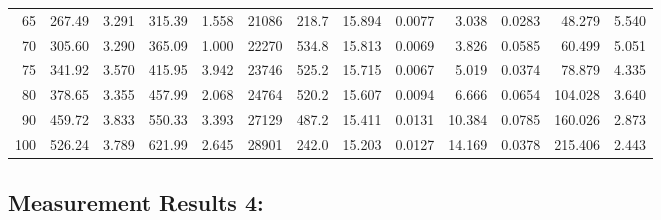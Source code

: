 \documentclass[10pt]{article}
\begin{document}
{\begin{tabular}{|r|rr|rr|rr|rr|rr|r|r|}
       65 &       267.49 &        3.291 &       315.39 &        1.558 &        21086 &        218.7 &       15.894 &       0.0077 &        3.038 &       0.0283 &       48.279 &        5.540 \\
       70 &       305.60 &        3.290 &       365.09 &        1.000 &        22270 &        534.8 &       15.813 &       0.0069 &        3.826 &       0.0585 &       60.499 &        5.051 \\
       75 &       341.92 &        3.570 &       415.95 &        3.942 &        23746 &        525.2 &       15.715 &       0.0067 &        5.019 &       0.0374 &       78.879 &        4.335 \\
       80 &       378.65 &        3.355 &       457.99 &        2.068 &        24764 &        520.2 &       15.607 &       0.0094 &        6.666 &       0.0654 &      104.028 &        3.640 \\
       90 &       459.72 &        3.833 &       550.33 &        3.393 &        27129 &        487.2 &       15.411 &       0.0131 &       10.384 &       0.0785 &      160.026 &        2.873 \\
      100 &       526.24 &        3.789 &       621.99 &        2.645 &        28901 &        242.0 &       15.203 &       0.0127 &       14.169 &       0.0378 &      215.406 &        2.443 \\
\hline
\end{tabular}
}



\subsection*{\large \bf Measurement Results 4:}
\end{document}
